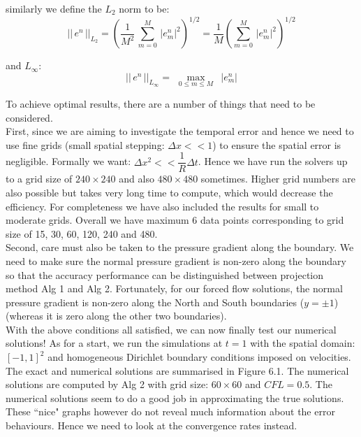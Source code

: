 similarly we define the $L_2$ norm to be:
\begin{equation}
||\,e^n\,||_{L_2} = \left(\dfrac{1}{M^2}\,\sum^M_{m=0}\,|e^n_m|^2\right)^{1/2} = \dfrac{1}{M}\left(\sum^M_{m=0}\,|e^n_m|^2\right)^{1/2}
\end{equation}

and $L_\infty$:
\begin{equation}
||\,e^n\,||_{L_\infty} = \max_{\,\,\,0 \leq m \leq M\,\,\,}\,|e^n_m|
\end{equation}

To achieve optimal results, there are a number of things that need to be considered. \\
First, since we are aiming to investigate the temporal error and hence we need to use fine grids (small spatial stepping: $\Delta x <<1$) to ensure the spatial error is negligible. Formally we want: $\Delta x^2 << \dfrac{1}{R}\Delta t$. Hence we have run the solvers up to a grid size of $240 \times 240$ and also $480 \times 480$ sometimes. Higher grid numbers are also possible but takes very long time to compute, which would decrease the efficiency. For completeness we have also included the results for small to moderate grids. Overall we have maximum 6 data points corresponding to grid size of 15, 30, 60, 120, 240 and 480.\\

Second, care must also be taken to the pressure gradient along the boundary. We need to make sure the normal pressure gradient is non-zero along the boundary so that the accuracy performance can be distinguished between projection method Alg 1 and Alg 2. Fortunately, for our forced flow solutions, the normal pressure gradient is non-zero along the North and South boundaries ($y = \pm 1$) (whereas it is zero along the other two boundaries).\\

With the above conditions all satisfied, we can now finally test our numerical solutions! As for a start, we run the simulations at $t = 1$ with the spatial domain: $[-1,1]^2$ and homogeneous Dirichlet boundary conditions imposed on velocities.\\

The exact and numerical solutions are summarised in Figure 6.1. The numerical solutions are computed by Alg 2 with grid size: $60 \times 60$ and $CFL = 0.5$. The numerical solutions seem to do a good job in approximating the true solutions. These ``nice" graphs however do not reveal much information about the error behaviours. Hence we need to look at the convergence rates instead.\\


